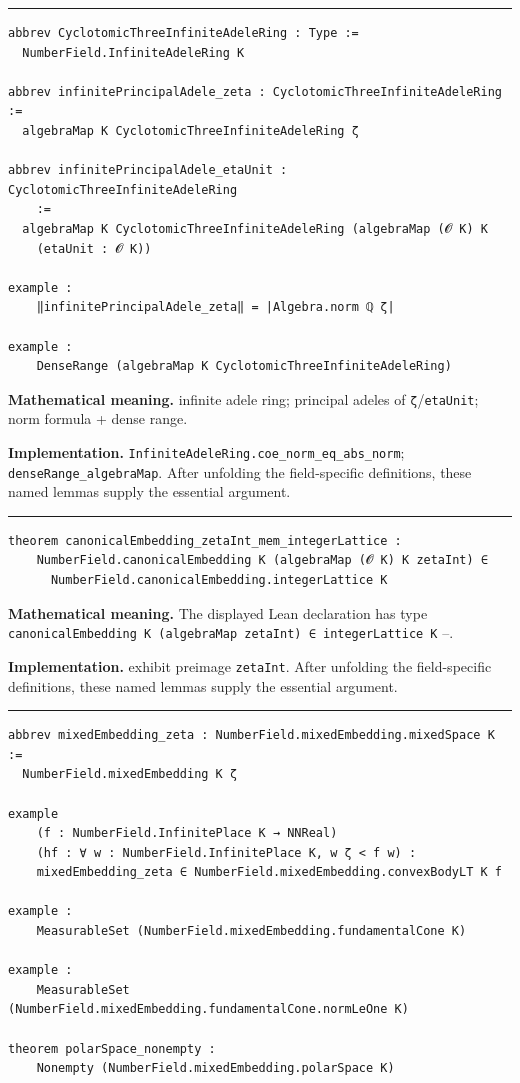 \documentclass[UTF8,a4paper,11pt,fontset=fandol]{ctexart}
\theoremstyle{definition}
\newcommand{\statementsep}{\par\medskip\hrule\medskip}
\begin{document}
\statementsep
\begin{verbatim}
abbrev CyclotomicThreeInfiniteAdeleRing : Type :=
  NumberField.InfiniteAdeleRing K

abbrev infinitePrincipalAdele_zeta : CyclotomicThreeInfiniteAdeleRing :=
  algebraMap K CyclotomicThreeInfiniteAdeleRing ζ

abbrev infinitePrincipalAdele_etaUnit : CyclotomicThreeInfiniteAdeleRing
    :=
  algebraMap K CyclotomicThreeInfiniteAdeleRing (algebraMap (𝓞 K) K
    (etaUnit : 𝓞 K))

example :
    ‖infinitePrincipalAdele_zeta‖ = |Algebra.norm ℚ ζ|

example :
    DenseRange (algebraMap K CyclotomicThreeInfiniteAdeleRing)
\end{verbatim}
\noindent\textbf{Mathematical meaning.} infinite adele ring; principal adeles of \texttt{ζ}/\texttt{etaUnit}; norm formula + dense range.\par
\noindent\textbf{Implementation.} \texttt{InfiniteAdeleRing.\allowbreak{}coe\_\allowbreak{}norm\_\allowbreak{}eq\_\allowbreak{}abs\_\allowbreak{}norm}; \texttt{denseRange\_\allowbreak{}algebraMap}. After unfolding the field-specific definitions, these named lemmas supply the essential argument.\par
\statementsep
\begin{verbatim}
theorem canonicalEmbedding_zetaInt_mem_integerLattice :
    NumberField.canonicalEmbedding K (algebraMap (𝓞 K) K zetaInt) ∈
      NumberField.canonicalEmbedding.integerLattice K
\end{verbatim}
\noindent\textbf{Mathematical meaning.} The displayed Lean declaration has type \texttt{canonicalEmbedding K (algebraMap zetaInt) ∈ integerLattice K} --.\par
\noindent\textbf{Implementation.} exhibit preimage \texttt{zetaInt}. After unfolding the field-specific definitions, these named lemmas supply the essential argument.\par
\statementsep
\begin{verbatim}
abbrev mixedEmbedding_zeta : NumberField.mixedEmbedding.mixedSpace K :=
  NumberField.mixedEmbedding K ζ

example
    (f : NumberField.InfinitePlace K → NNReal)
    (hf : ∀ w : NumberField.InfinitePlace K, w ζ < f w) :
    mixedEmbedding_zeta ∈ NumberField.mixedEmbedding.convexBodyLT K f

example :
    MeasurableSet (NumberField.mixedEmbedding.fundamentalCone K)

example :
    MeasurableSet (NumberField.mixedEmbedding.fundamentalCone.normLeOne K)

theorem polarSpace_nonempty :
    Nonempty (NumberField.mixedEmbedding.polarSpace K)
\end{verbatim}
\end{document}
